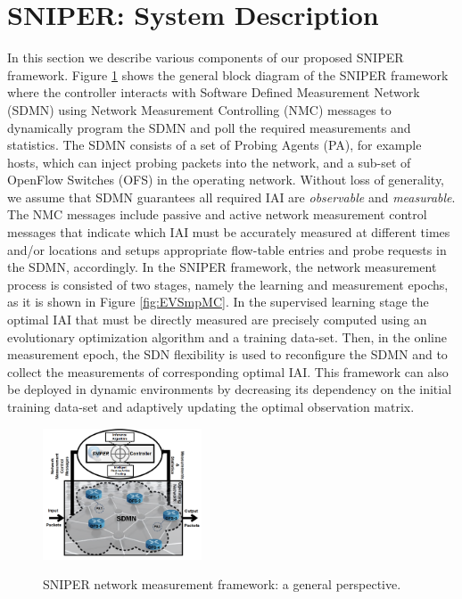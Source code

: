 \section{SNIPER: System Description}  \label{sec:SNIPERSysDsc}
In this section we describe various components of our proposed SNIPER framework. Figure \ref{fig:GBDSNIPER} shows the general block diagram
of the SNIPER framework where the controller interacts with Software
Defined Measurement Network (SDMN) using Network
Measurement Controlling (NMC) messages to dynamically program the SDMN
and poll the required measurements and statistics. The SDMN consists
of a set of Probing Agents (PA), for example hosts, which can inject probing packets into the network, and a sub-set of OpenFlow Switches (OFS) in the
operating network. Without loss of generality, we assume that SDMN
guarantees all required IAI are \emph{observable} and
\emph{measurable}. The NMC messages include passive and active network
measurement control messages that indicate which IAI must be
accurately measured at different times and/or locations and setups
appropriate flow-table entries and probe requests in the SDMN,
accordingly. In the SNIPER framework, the network measurement process
is consisted of two stages, namely the learning and measurement
epochs, as it is shown in Figure \ref{fig:EVSmpMC}. In the supervised learning stage the optimal IAI that must be directly measured are precisely computed using an evolutionary optimization algorithm and a training data-set. Then, in the online measurement epoch, the SDN flexibility is used to reconfigure the SDMN and to collect the measurements of corresponding optimal IAI. This framework can also be deployed in
dynamic environments by decreasing its dependency on the initial
training data-set and adaptively updating the optimal observation
matrix.
\begin{figure}[t]
  \begin{center}
    {\includegraphics[keepaspectratio, width=0.42\textwidth]{GBDSNIPER_New2.png}}
  \end{center}
  \caption{{SNIPER network measurement framework: a general perspective.}}
  \label{fig:GBDSNIPER}
\end{figure}
